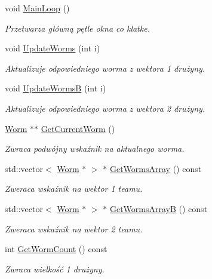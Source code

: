 \begin{DoxyCompactItemize}
void \mbox{\hyperlink{class_game_window_a7dcdd3731da278a522c59a72ecee77b3}{Main\+Loop}} ()
\begin{DoxyCompactList}\small\item\em Przetwarza główną pętle okna co klatke. \end{DoxyCompactList}\item 
void \mbox{\hyperlink{class_game_window_a043804fa483c8ea2f348b6fb1dac4e4a}{Update\+Worms}} (int i)
\begin{DoxyCompactList}\small\item\em Aktualizuje odpowiedniego worma z wektora 1 drużyny. \end{DoxyCompactList}\item 
void \mbox{\hyperlink{class_game_window_aa6659ccbd2a5d27141eb3f00fdc72ea6}{Update\+WormsB}} (int i)
\begin{DoxyCompactList}\small\item\em Aktualizuje odpowiedniego worma z wektora 2 drużyny. \end{DoxyCompactList}\item 
\mbox{\hyperlink{class_worm}{Worm}} $\ast$$\ast$ \mbox{\hyperlink{class_game_window_a172c7184152f5c49a5089205ae3528f5}{Get\+Current\+Worm}} ()
\begin{DoxyCompactList}\small\item\em Zwraca podwójny wskaźnik na aktualnego worma. \end{DoxyCompactList}\item 
std\+::vector$<$ \mbox{\hyperlink{class_worm}{Worm}} $\ast$ $>$ $\ast$ \mbox{\hyperlink{class_game_window_a7535403f5d3ab3ffe22c711665102052}{Get\+Worms\+Array}} () const
\begin{DoxyCompactList}\small\item\em Zweraca wskaźnik na wektor 1 team\textquotesingle{}u. \end{DoxyCompactList}\item 
std\+::vector$<$ \mbox{\hyperlink{class_worm}{Worm}} $\ast$ $>$ $\ast$ \mbox{\hyperlink{class_game_window_ab9695e10e5a991a9df920911402b9272}{Get\+Worms\+ArrayB}} () const
\begin{DoxyCompactList}\small\item\em Zweraca wskaźnik na wektor 2 team\textquotesingle{}u. \end{DoxyCompactList}\item 
int \mbox{\hyperlink{class_game_window_acfef11596afd262e0e4e77051ed24cde}{Get\+Worm\+Count}} () const
\begin{DoxyCompactList}\small\item\em Zwraca wielkość 1 drużyny. \end{DoxyCompactList}\item 
$$
\end{DoxyCompactItemize}
